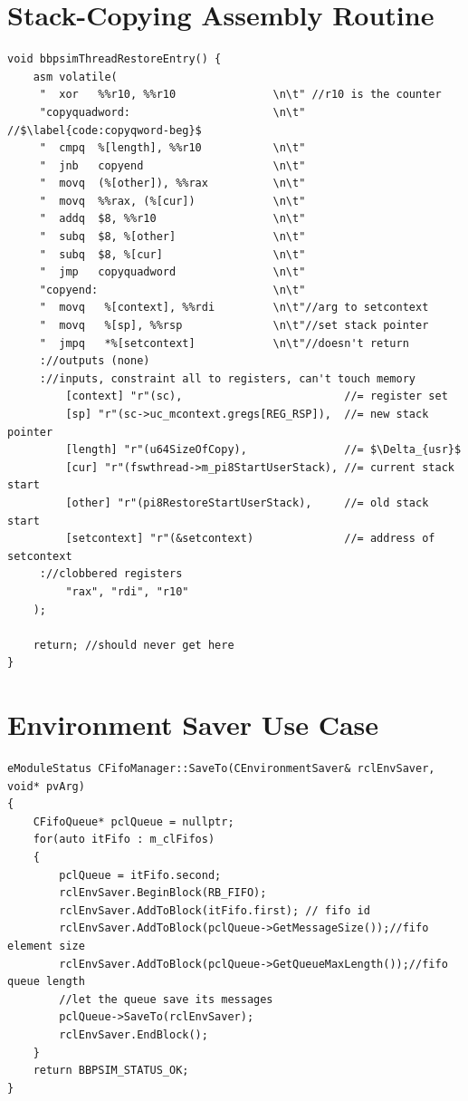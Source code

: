 {\chapter{Stack-Copying Assembly Routine}\label{code:stk-copy-asm}

\begin{verbatim}
void bbpsimThreadRestoreEntry() {
	asm volatile(
	 "  xor   %%r10, %%r10               \n\t" //r10 is the counter
	 "copyquadword:                      \n\t" //$\label{code:copyqword-beg}$
	 "  cmpq  %[length], %%r10           \n\t"
	 "  jnb   copyend                    \n\t"
	 "  movq  (%[other]), %%rax          \n\t"
	 "  movq  %%rax, (%[cur])            \n\t"
	 "  addq  $8, %%r10                  \n\t"
	 "  subq  $8, %[other]               \n\t"
	 "  subq  $8, %[cur]                 \n\t"
	 "  jmp   copyquadword               \n\t"
	 "copyend:                           \n\t"
	 "  movq   %[context], %%rdi         \n\t"//arg to setcontext
	 "  movq   %[sp], %%rsp              \n\t"//set stack pointer
	 "  jmpq   *%[setcontext]            \n\t"//doesn't return
	 ://outputs (none)
	 ://inputs, constraint all to registers, can't touch memory
	     [context] "r"(sc),                         //= register set
	     [sp] "r"(sc->uc_mcontext.gregs[REG_RSP]),  //= new stack pointer
	     [length] "r"(u64SizeOfCopy),               //= $\Delta_{usr}$
	     [cur] "r"(fswthread->m_pi8StartUserStack), //= current stack start
	     [other] "r"(pi8RestoreStartUserStack),     //= old stack start
	     [setcontext] "r"(&setcontext)              //= address of setcontext 
	 ://clobbered registers
	     "rax", "rdi", "r10"
	);
	
	return; //should never get here
}
\end{verbatim}

\chapter{Environment Saver Use Case}\label{code:env-saver-use}

\begin{verbatim}
eModuleStatus CFifoManager::SaveTo(CEnvironmentSaver& rclEnvSaver, void* pvArg)
{
	CFifoQueue* pclQueue = nullptr;
	for(auto itFifo : m_clFifos)
	{
		pclQueue = itFifo.second;
		rclEnvSaver.BeginBlock(RB_FIFO);
		rclEnvSaver.AddToBlock(itFifo.first); // fifo id
		rclEnvSaver.AddToBlock(pclQueue->GetMessageSize());//fifo element size
		rclEnvSaver.AddToBlock(pclQueue->GetQueueMaxLength());//fifo queue length
		//let the queue save its messages
		pclQueue->SaveTo(rclEnvSaver);
		rclEnvSaver.EndBlock();
	}
	return BBPSIM_STATUS_OK;
}
\end{verbatim}

}
